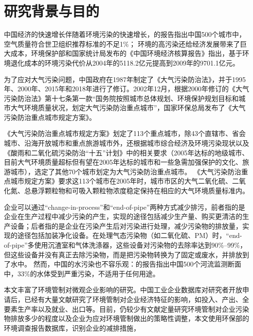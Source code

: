\documentclass{ctexart}
\title{}
\author{罗文杰 \\ 1930071013 \\ 暨南大学产业经济研究院}
\date{}
\begin{document}
	\maketitle
	\section{研究背景与目的}
中国经济的快速增长伴随着环境污染的快速增长，\textcite{world2007cost}的报告指出中国500个城市中，空气质量符合世卫组织推荐标准的不足1\%； 
环境的高污染还给经济发展带来了巨大成本，环境保护部和国家统计局发布的《中国环境经济核算报告》指出，基于环境退化成本的环境污染代价从2004年的5118.2亿元提高到2009年的9701.1亿元。

为了应对大气污染问题，中国政府在1987年制定了《大气污染防治法》，并于1995年、2000年、2015年和2018年进行了修订。2002年12月，根据2000年修订的《大气污染防治法》第十七条第一款“国务院按照城市总体规划、环境保护规划目标和城市大气环境质量状况，划定大气污染防治重点城市”，国家环保总局发布了《大气污染防治重点城市规定方案》。

《大气污染防治重点城市规定方案》划定了113个重点城市，除43个直辖市、省会城市、沿海开放城市和重点旅游城市外，还根据城市综合经济及环境污染现状以及《酸雨和二氧化硫污染防治“十五”计划》中的相关要求（2005年达标的地级城市、目前大气环境质量超标但有望在2005年达标的城市和一些急需加强保护的文化、旅游城市），选定了其他70个城市划定为大气污染防治重点城市。
《大气污染防治重点城市规定方案》要求这113个城市在2005年时，城市市区的大气二氧化硫、二氧化氮、总悬浮颗粒物和可吸入颗粒物浓度稳定保持在相应的大气环境质量标准内。

企业可以通过``change-in-process''和``end-of-pipe''两种方式减少排污\cite{liu2018corporate}，前者指的是企业在生产过程中减少污染的产生，实现的途径包括减少生产量、购买更清洁的生产设备；后者指的是企业在污染产生后对污染进行处理，减少污染物的排放量，实现的途径包括加装净化设备。在处理气态污染物（如二氧化硫、PM）时，``end-of-pipe''多使用沉渣室和气体洗涤器，这些设备对污染物的去除率达到90\%--99\%，但这些设备并没有真正去除污染物，而是把污染物转换为了固定或废水，并排放到了水中\cite{greenstone2003estimating}。
然而，中国的水污染也不容乐观：\textcite{world2006china}的报告指出中国500个河流监测断面中，33\%的水体受到严重污染，不适用于任何用途。

本文丰富了环境管制对微观企业影响的研究。中国工业企业数据库对研究者开放申请后，已经有大量文献研究了环境管制对企业经济特征的影响，如投入、产出、全要素生产率以及就业、出口等。目前，仍较少有文献定量研究环境管制对企业污染物排放多少的程度以及企业为应对环境管制做出的策略性调整，本文使用环保部的环境调查报告数据库，识别企业的减排措施，
\end{document}
